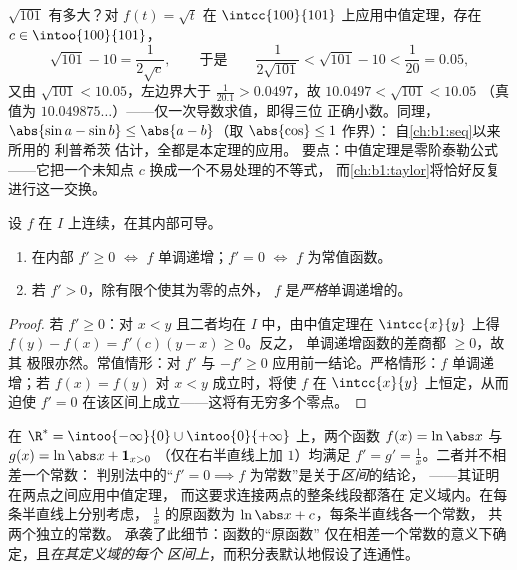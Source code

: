 \begin{example}[作为估计工具的中值定理]\label{ex:b1:derivative:mvtestimate}
$\sqrt{101}$ 有多大？对 $f(t) = \sqrt t$
在 $\intcc{100}{101}$ 上应用中值定理，存在 $c \in \intoo{100}{101}$，
\[
\sqrt{101} - 10 = \frac{1}{2\sqrt c},
\qquad\text{于是}\qquad
\frac{1}{2\sqrt{101}} < \sqrt{101} - 10 < \frac{1}{20} = 0.05 ,
\]
又由 $\sqrt{101} < 10.05$，左边界大于
$\frac{1}{20.1} > 0.0497$，故 $10.0497 < \sqrt{101} < 10.05$
（真值为 $10.049875\dots$）——仅一次导数求值，即得三位
正确小数。同理，$\abs{\sin a - \sin b} \leq
\abs{a - b}$（取 $\abs{\cos}\leq 1$ 作界）：
自\cref{ch:b1:seq}以来所用的 利普希茨 估计，全都是本定理的应用。
要点：中值定理是零阶泰勒公式
——它把一个未知点 $c$ 换成一个不易处理的不等式，
而\cref{ch:b1:taylor}将恰好反复进行这一交换。
\end{example}

\begin{corollary}[单调性判别法]\label{cor:b1:derivative:monotone}
设 $f$ 在 $I$ 上连续，在其内部可导。
\begin{enumerate}
  \item 在内部 $f' \geq 0$ $\iff$ $f$ 单调递增；$f' = 0$
        $\iff$ $f$ 为常值函数。
  \item 若 $f' > 0$，除有限个使其为零的点外，
        $f$ 是\emph{严格}单调递增的。
\end{enumerate}
\end{corollary}

\begin{proof}
若 $f' \geq 0$：对 $x < y$ 且二者均在 $I$ 中，由中值定理在
$\intcc{x}{y}$ 上得 $f(y) - f(x) = f'(c)(y - x) \geq 0$。反之，
单调递增函数的差商都 $\geq 0$，故其
极限亦然。常值情形：对 $f'$ 与
$-f' \geq 0$ 应用前一结论。严格情形：$f$ 单调递增；若 $f(x) =
f(y)$ 对 $x < y$ 成立时，将使 $f$ 在 $\intcc{x}{y}$ 上恒定，从而迫使 $f' =
0$ 在该区间上成立——这将有无穷多个零点。
\end{proof}

\begin{example}\label{ex:b1:derivative:intervalmatters}
在 $\R^* = \intoo{-\infty}{0} \cup \intoo{0}{+\infty}$ 上，两个函数
$f(x) = \ln\abs x$ 与 $g(x) = \ln\abs x + \mathbf{1}_{x>0}$
（仅在右半直线上加 $1$）均满足 $f' = g' =
\frac1x$。二者并不相差一个常数：
判别法中的“$f' = 0 \implies f$ 为常数”是关于\emph{区间}的结论，
——其证明在两点之间应用中值定理，
而这要求连接两点的整条线段都落在
定义域内。在每条半直线上分别考虑，
$\frac1x$ 的原函数为 $\ln\abs x + c$，每条半直线各一个常数，
共两个独立的常数。
承袭了此细节：函数的“原函数”
仅在相差一个常数的意义下确定，且\emph{在其定义域的每个
区间上}，而积分表默认地假设了连通性。
\end{example}

